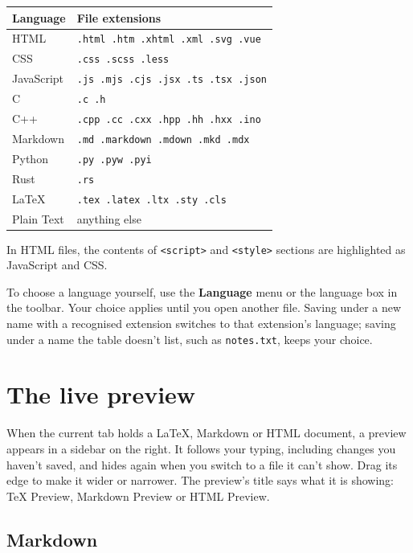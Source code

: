 \documentclass[11pt,a4paper]{article}
\newcommand{\menu}[1]{\textsf{\textbf{#1}}}
\newcommand{\ui}[1]{\textsf{#1}}
\begin{document}
\begin{center}
\begin{tabularx}{\linewidth}{>{\sffamily}l X}
  \toprule
  \textbf{Language} & \textbf{File extensions} \\
  \midrule
  HTML       & \texttt{.html .htm .xhtml .xml .svg .vue} \\
  CSS        & \texttt{.css .scss .less} \\
  JavaScript & \texttt{.js .mjs .cjs .jsx .ts .tsx .json} \\
  C          & \texttt{.c .h} \\
  C++        & \texttt{.cpp .cc .cxx .hpp .hh .hxx .ino} \\
  Markdown   & \texttt{.md .markdown .mdown .mkd .mdx} \\
  Python     & \texttt{.py .pyw .pyi} \\
  Rust       & \texttt{.rs} \\
  LaTeX      & \texttt{.tex .latex .ltx .sty .cls} \\
  Plain Text & anything else \\
  \bottomrule
\end{tabularx}
\end{center}

In HTML files, the contents of \texttt{<script>} and \texttt{<style>} sections
are highlighted as JavaScript and CSS.

To choose a language yourself, use the \menu{Language} menu or the language box
in the toolbar. Your choice applies until you open another file. Saving under a
new name with a recognised extension switches to that extension's language;
saving under a name the table doesn't list, such as \texttt{notes.txt}, keeps
your choice.

\section{The live preview}\label{sec:texpreview}

When the current tab holds a \LaTeX, Markdown or HTML document, a preview
appears in a sidebar on the right. It follows your typing, including changes
you haven't saved, and hides again when you switch to a file it can't show.
Drag its edge to make it wider or narrower. The preview's title says what it
is showing: \ui{TeX Preview}, \ui{Markdown Preview} or \ui{HTML Preview}.

\subsection{Markdown}
\end{document}
